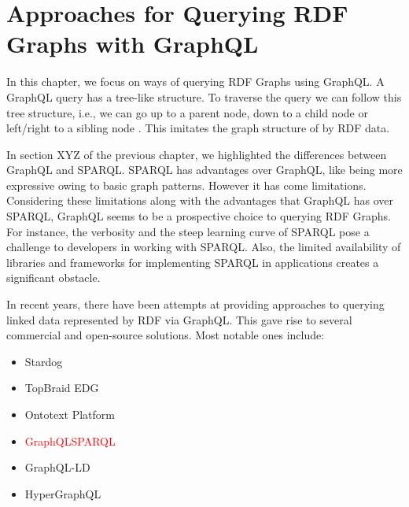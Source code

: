 \chapter{Approaches for Querying RDF Graphs with GraphQL}

In this chapter, we focus on ways of querying RDF Graphs using GraphQL. A GraphQL query has a tree-like structure. To traverse the query we can follow this tree structure, i.e., we can go up to a parent node, down to a child node or left/right to a sibling node \cite{Perez2009}. This imitates the graph structure of by RDF data.

In section XYZ of the previous chapter, we highlighted the differences between GraphQL and SPARQL. SPARQL has advantages over GraphQL, like being more expressive owing to basic graph patterns. However it has come limitations. Considering these limitations along with the advantages that GraphQL has over SPARQL, GraphQL seems to be a prospective choice to querying RDF Graphs.  For instance, the verbosity and the steep learning curve of SPARQL pose a challenge to developers in working with SPARQL. Also, the limited availability of libraries and frameworks for implementing SPARQL in applications creates a significant obstacle. 

In recent years, there have been attempts at providing approaches to querying linked data represented by RDF via GraphQL. This gave rise to several commercial and open-source solutions. Most notable ones include:

\begin{itemize}
	\item Stardog
	\item TopBraid EDG
	\item Ontotext Platform
	\item \textcolor{red}{GraphQLSPARQL} 
	\item GraphQL-LD
	\item HyperGraphQL

\end{itemize}

